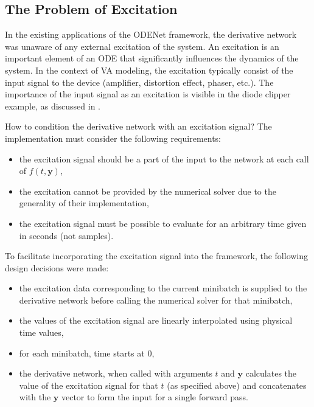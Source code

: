 \subsection{The Problem of Excitation}
\label{subsec:excitation}

In the existing applications of the ODENet framework, the derivative network was unaware of any external excitation of the system. An excitation is an important element of an \ac{ODE} that significantly influences the dynamics of the system. In the context of \ac{VA} modeling, the excitation typically consist of the input signal to the device (amplifier, distortion effect, phaser, etc.). The importance of the input signal as an excitation is visible in the diode clipper example, as discussed in .

How to condition the derivative network with an excitation signal? The implementation must consider the following requirements:
\begin{itemize}
  \item the excitation signal should be a part of the input to the network at each call of $f(t, \pmb{y})$,
  \item the excitation cannot be provided by the numerical solver due to the generality of their implementation,
  \item the excitation signal must be possible to evaluate for an arbitrary time given in seconds (not samples).
\end{itemize}

To facilitate incorporating the excitation signal into the framework, the following design decisions were made:
\begin{itemize}
  \item the excitation data corresponding to the current minibatch is supplied to the derivative network before calling the numerical solver for that minibatch,
  \item the values of the excitation signal are linearly interpolated using physical time values,
  \item for each minibatch, time starts at 0,
  \item the derivative network, when called with arguments $t$ and $\pmb{y}$ calculates the value of the excitation signal for that $t$ (as specified above) and concatenates with the $\pmb{y}$ vector to form the input for a single forward pass.
\end{itemize}

